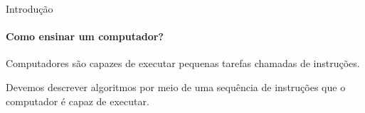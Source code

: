 \documentclass{beamer}
\begin{document}
  \begin{frame}{Introdução}
  	\framesubtitle{Como ensinar um computador?}
  	Computadores são capazes de executar pequenas tarefas chamadas de \alert{instruções}.
  	
  	Devemos descrever algoritmos por meio de uma sequência de instruções que o computador é capaz de executar.
  	
  \end{frame}
\end{document}
